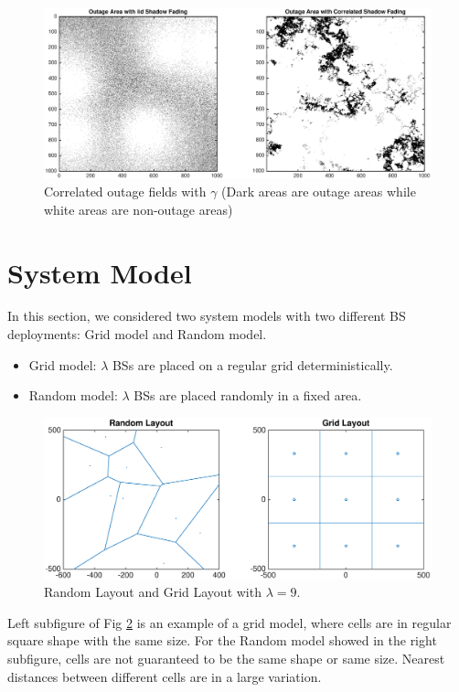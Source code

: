  \begin{figure}
 \centering
 \includegraphics[width=14cm]{outageArea.eps}
 \caption{Correlated outage fields with $\gamma$ (Dark areas are outage areas while white areas are non-outage areas)}
 \label{4:outagefie}
 \end{figure}


 \section{System Model}
 \label{4:SystemModel}
 In this section, we considered two system models with two different BS deployments: Grid model and Random model.
 \begin{itemize}
 \item Grid model: $\lambda$ BSs are placed on a regular grid deterministically.
 \item Random model: $\lambda$ BSs are placed randomly in a fixed area.
 \end{itemize}
 \begin{figure}
 \centering
 \includegraphics[width=14cm]{systemLayout.eps}
 \caption{Random Layout and Grid Layout with $\lambda = 9$.}
 \label{4:RandomLayout}
 \end{figure}
 Left subfigure of Fig \ref{4:RandomLayout} is an example of a grid model, where cells are in regular square shape with the same size. For the Random model showed in the right subfigure, cells are not guaranteed to be the same shape or same size. Nearest distances between different cells are in a large variation. 


